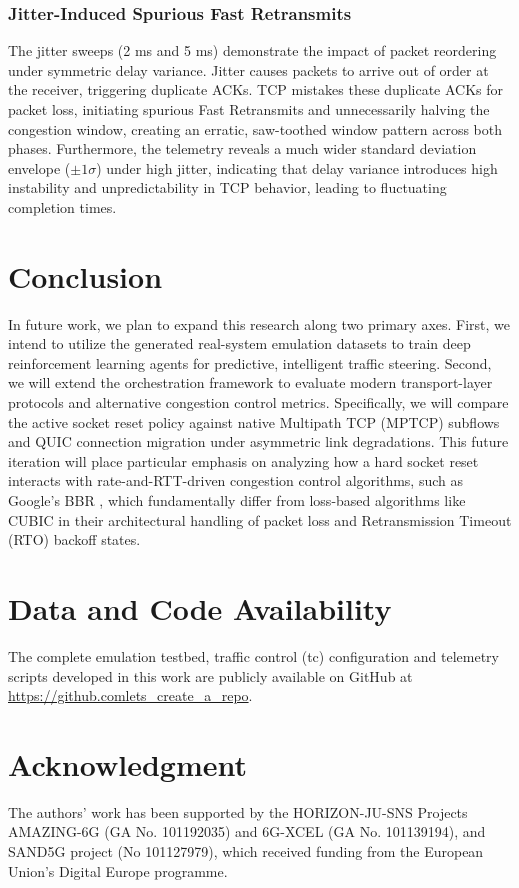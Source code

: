 \documentclass[conference]{IEEEtran}
\begin{document}
\subsubsection{Jitter-Induced Spurious Fast Retransmits}
The jitter sweeps (2 ms and 5 ms) demonstrate the impact of packet reordering under symmetric delay variance. Jitter causes packets to arrive out of order at the receiver, triggering duplicate ACKs. TCP mistakes these duplicate ACKs for packet loss, initiating spurious Fast Retransmits and unnecessarily halving the congestion window, creating an erratic, saw-toothed window pattern across both phases. Furthermore, the telemetry reveals a much wider standard deviation envelope ($\pm1\sigma$) under high jitter, indicating that delay variance introduces high instability and unpredictability in TCP behavior, leading to fluctuating completion times.






\section{Conclusion}
In future work, we plan to expand this research along two primary axes. First, we intend to utilize the generated real-system emulation datasets to train deep reinforcement learning agents for predictive, intelligent traffic steering. Second, we will extend the orchestration framework to evaluate modern transport-layer protocols and alternative congestion control metrics. Specifically, we will compare the active socket reset policy against native Multipath TCP (MPTCP) subflows  and QUIC connection migration \cite{rfc9000} under asymmetric link degradations. This future iteration will place particular emphasis on analyzing how a hard socket reset interacts with rate-and-RTT-driven congestion control algorithms, such as Google's BBR \cite{Cardwell2016BBR}, which fundamentally differ from loss-based algorithms like CUBIC in their architectural handling of packet loss and Retransmission Timeout (RTO) backoff states.

\section*{Data and Code Availability}
The complete emulation testbed, traffic control (tc) configuration and telemetry  scripts developed in this work are publicly available on GitHub at \url{https://github.comlets_create_a_repo}.


\section*{Acknowledgment}
The authors' work has been supported by the HORIZON-JU-SNS Projects AMAZING-6G (GA No. 101192035) and 6G-XCEL (GA No. 101139194), and SAND5G project (No 101127979), which received funding from the European Union's Digital Europe programme.





\end{document}
